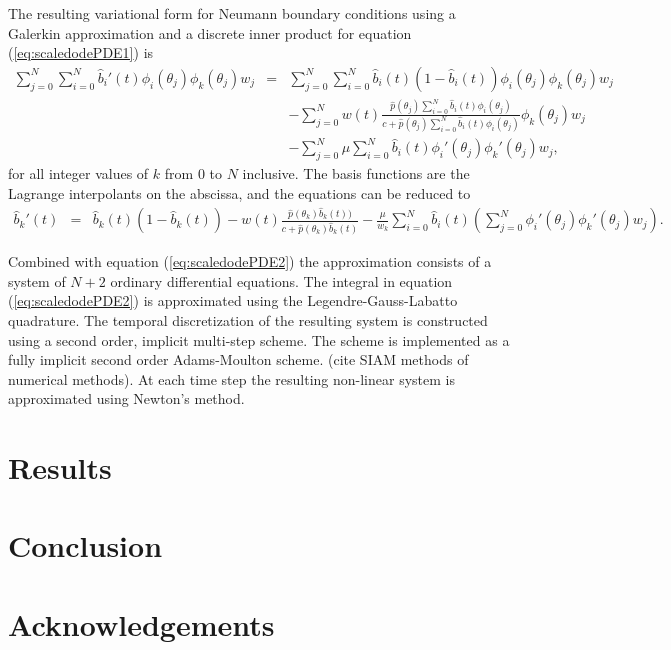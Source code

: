 \documentclass[12pt]{article}
\begin{document}
The resulting variational form for Neumann boundary conditions using a
Galerkin approximation and a discrete inner product for equation
(\ref{eq:scaledodePDE1}) is
\begin{eqnarray}
  \sum_{j=0}^N \sum_{i=0}^N  \hat{b}_i'(t) \phi_i(\theta_j) \phi_k(\theta_j) w_j
  & = &
  \sum_{j=0}^N \sum_{i=0}^N  \hat{b}_i(t) (1 - \hat{b}_i(t) ) \phi_i(\theta_j) \phi_k(\theta_j) w_j \\
  & &  -  \sum_{j=0}^N w(t) \frac{\hat{p}(\theta_j) \sum_{i=0}^N \hat{b}_i(t) \phi_i(\theta_j) }{c+\hat{p}(\theta_j) \sum_{i=0}^N \hat{b}_i(t) \phi_i(\theta_j)} \phi_k(\theta_j) w_j \nonumber \\ 
  & & - \sum_{j=0}^N \mu  \sum_{i=0}^N \hat{b}_i(t) \phi_i'(\theta_j) \phi_k'(\theta_j)  w_j, \nonumber
\end{eqnarray}
for all integer values of $k$ from $0$ to $N$ inclusive.  The basis
functions are the Lagrange interpolants on the abscissa, and the
equations can be reduced to
\begin{eqnarray}
  \hat{b}_k'(t) 
  & = &
  \hat{b}_k(t) (1 - \hat{b}_k(t) ) -  w(t) \frac{\hat{p}(\theta_k) \hat{b}_k(t)) }{c+\hat{p}(\theta_k)  \hat{b}_k(t) }  
   - \frac{\mu}{w_k} \sum_{i=0}^N \hat{b}_i(t) \left( \sum_{j=0}^N  \phi_i'(\theta_j) \phi_k'(\theta_j)  w_j \right). \nonumber
\end{eqnarray}

Combined with equation (\ref{eq:scaledodePDE2}) the approximation
consists of a system of $N+2$ ordinary differential equations. The
integral in equation (\ref{eq:scaledodePDE2}) is approximated using
the Legendre-Gauss-Labatto quadrature. The temporal discretization of
the resulting system is constructed using a second order, implicit
multi-step scheme. The scheme is implemented as a fully implicit
second order Adams-Moulton scheme.  (cite SIAM methods of numerical
methods). At each time step the resulting non-linear system is
approximated using Newton's method.

\section{Results}
\label{section:results}

\section{Conclusion}

\section{Acknowledgements}
\end{document}
